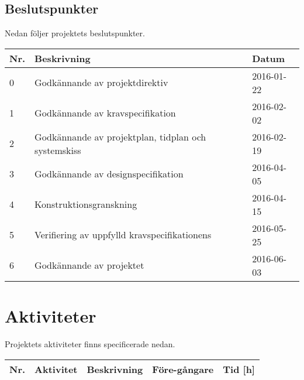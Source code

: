 \documentclass[11pt]{article}
\begin{document}
\begin{flushleft}
\begin{longtable}{| p{.05\linewidth} | p{.7\linewidth} | p{.15\linewidth} |}
\end{longtable}

\subsection{Beslutspunkter}
Nedan följer projektets beslutspunkter.

\begin{longtable}{| p{.05\linewidth} | p{.7\linewidth} | p{.15\linewidth} |} \hline
\textbf{Nr.} & \textbf{Beskrivning} & \textbf{Datum} \\ \hline
0 & Godkännande av projektdirektiv & 2016-01-22 \\ \hline
1 & Godkännande av kravspecifikation & 2016-02-02 \\ \hline
2 & Godkännande av projektplan, tidplan och systemskiss & 2016-02-19 \\ \hline
3 & Godkännande av designspecifikation & 2016-04-05 \\ \hline
4 & Konstruktionsgranskning & 2016-04-15 \\ \hline
5 & Verifiering av uppfylld kravspecifikationens & 2016-05-25 \\ \hline
6 & Godkännande av projektet & 2016-06-03 \\ \hline

\end{longtable}

\pagebreak
\section{Aktiviteter}
Projektets aktiviteter finns specificerade nedan. 
\begin{longtable}{| p{.05\linewidth} | p{.25\linewidth} | p{.4\linewidth} | p{.1\linewidth} | p{.05\linewidth} |} \hline

\textbf{Nr.} & \textbf{Aktivitet} & \textbf{Beskrivning} & \textbf{Före-gångare} & \textbf{Tid [h]} \\ \hline \endhead


\end{longtable}
\end{flushleft}
\end{document}
